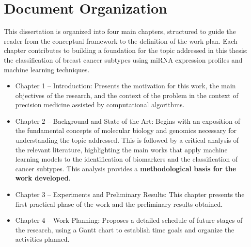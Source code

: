 \section{Document Organization}
\label{sec:document-organization}
This dissertation is organized into four main chapters, structured to guide the
reader from the conceptual framework to the definition of the work plan. Each
chapter contributes to building a foundation for the topic addressed in this
thesis: the classification of breast cancer subtypes using miRNA expression
profiles and machine learning techniques.
\begin{itemize}
  \item Chapter 1 – Introduction: Presents the motivation for this work, the main
        objectives of the research, and the context of the problem in the context of
        precision medicine assisted by computational algorithms.

  \item Chapter 2 – Background and State of the Art: Begins with an exposition of the
        fundamental concepts of molecular biology and genomics necessary for
        understanding the topic addressed. This is followed by a critical analysis of
        the relevant literature, highlighting the main works that apply machine
        learning models to the identification of biomarkers and the classification of
        cancer subtypes. This analysis provides a \textbf{methodological basis for the
          work developed}.

  \item Chapter 3 – Experiments and Preliminary Results: This chapter presents the
        first practical phase of the work and the preliminary results obtained.

  \item Chapter 4 – Work Planning: Proposes a detailed schedule of future stages of the
        research, using a Gantt chart to establish time goals and organize the
        activities planned.
\end{itemize}
